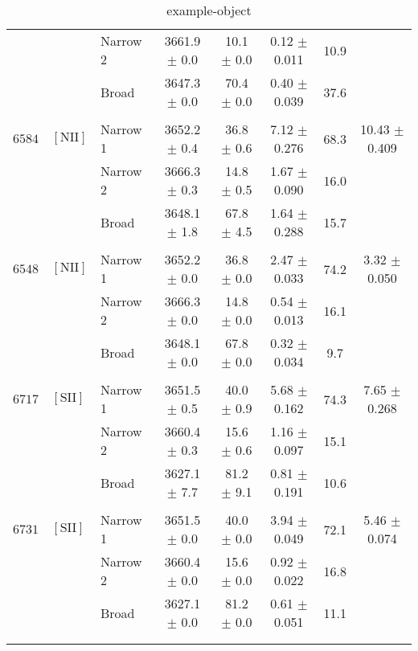 \documentclass{article}
\begin{document}
\begin{longtable}{lllccccc}
 &  & Narrow 2 & 3661.9 $\pm$ 0.0 & 10.1 $\pm$ 0.0 & 0.12 $\pm$ 0.011 & 10.9 &  \\ 
 &  & Broad & 3647.3 $\pm$ 0.0 & 70.4 $\pm$ 0.0 & 0.40 $\pm$ 0.039 & 37.6 &  \\ 
 &  &  &  &  &  &  &  \\ 
$6584$ & $\mathrm{[NII]}$ & Narrow 1 & 3652.2 $\pm$ 0.4 & 36.8 $\pm$ 0.6 & 7.12 $\pm$ 0.276 & 68.3 & 10.43 $\pm$ 0.409 \\ 
 &  & Narrow 2 & 3666.3 $\pm$ 0.3 & 14.8 $\pm$ 0.5 & 1.67 $\pm$ 0.090 & 16.0 &  \\ 
 &  & Broad & 3648.1 $\pm$ 1.8 & 67.8 $\pm$ 4.5 & 1.64 $\pm$ 0.288 & 15.7 &  \\ 
 &  &  &  &  &  &  &  \\ 
$6548$ & $\mathrm{[NII]}$ & Narrow 1 & 3652.2 $\pm$ 0.0 & 36.8 $\pm$ 0.0 & 2.47 $\pm$ 0.033 & 74.2 & 3.32 $\pm$ 0.050 \\ 
 &  & Narrow 2 & 3666.3 $\pm$ 0.0 & 14.8 $\pm$ 0.0 & 0.54 $\pm$ 0.013 & 16.1 &  \\ 
 &  & Broad & 3648.1 $\pm$ 0.0 & 67.8 $\pm$ 0.0 & 0.32 $\pm$ 0.034 & 9.7 &  \\ 
 &  &  &  &  &  &  &  \\ 
$6717$ & $\mathrm{[SII]}$ & Narrow 1 & 3651.5 $\pm$ 0.5 & 40.0 $\pm$ 0.9 & 5.68 $\pm$ 0.162 & 74.3 & 7.65 $\pm$ 0.268 \\ 
 &  & Narrow 2 & 3660.4 $\pm$ 0.3 & 15.6 $\pm$ 0.6 & 1.16 $\pm$ 0.097 & 15.1 &  \\ 
 &  & Broad & 3627.1 $\pm$ 7.7 & 81.2 $\pm$ 9.1 & 0.81 $\pm$ 0.191 & 10.6 &  \\ 
 &  &  &  &  &  &  &  \\ 
$6731$ & $\mathrm{[SII]}$ & Narrow 1 & 3651.5 $\pm$ 0.0 & 40.0 $\pm$ 0.0 & 3.94 $\pm$ 0.049 & 72.1 & 5.46 $\pm$ 0.074 \\ 
 &  & Narrow 2 & 3660.4 $\pm$ 0.0 & 15.6 $\pm$ 0.0 & 0.92 $\pm$ 0.022 & 16.8 &  \\ 
 &  & Broad & 3627.1 $\pm$ 0.0 & 81.2 $\pm$ 0.0 & 0.61 $\pm$ 0.051 & 11.1 &  \\ 
 &  &  &  &  &  &  &  \\ 
\hline
\caption{example-object}
\end{longtable}
\end{document}
